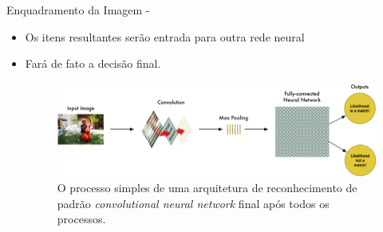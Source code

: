 \documentclass[aspectratio=169, xcolor=dvipsnames]{beamer}
\let\olditem=\item%
\renewcommand{\item}{\olditem \justifying}
\begin{document}
\begin{frame}[allowframebreaks]{Enquadramento da Imagem -}
\begin{itemize}
			\item Os itens resultantes serão entrada para outra rede neural

			\item Fará de fato a decisão final.

				\vspace{100px}

			\begin{figure}[h]
				\centering
				\includegraphics[width=1.0\linewidth]{img/convolucao_teoria.png}
				\caption{O processo simples de uma arquitetura de reconhecimento de padrão \textit{convolutional neural network} final após todos os processos.}
				\label{fig:convolucao_teoria}
			\end{figure}
		\end{itemize}
	\end{frame}
\end{document}
